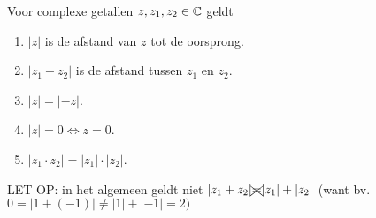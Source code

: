 \documentclass{ximera}
\begin{document}
\begin{proposition}\label{eig:complexe_modulus}
	Voor complexe getallen $z,z_1,z_2\in \mathbb{C}$ geldt
	\begin{enumerate}
		\item $|z|$ is de afstand van $z$ tot de oorsprong.
		\item $|z_1-z_2|$ is de afstand tussen $z_1$ en $z_2$.
		\item $|z|= |-z|$.		
		\item $|z|=0 \iff  z=0 $.
		\item $|z_1\cdot z_2| = |z_1| \cdot |z_2|$.
		
		
	\end{enumerate}
	LET OP: in het algemeen geldt niet $|z_1+z_2| \xcancel{=} |z_1|+|z_2|$ (want bv. $0= |1+(-1)| \neq |1|+|-1| = 2)$
	
\end{proposition}

\end{document}

